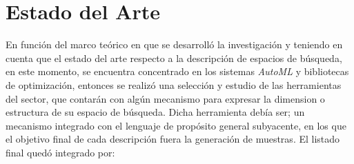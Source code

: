 \section{Estado del Arte}

En función del marco teórico en que se desarrolló la investigación y teniendo en cuenta
que el estado del arte respecto a la descripción de espacios de búsqueda, en este momento,
se encuentra concentrado en los sistemas {\it AutoML} y bibliotecas de optimización, entonces
se realizó una selección y estudio de las herramientas del sector, que contarán con algún
mecanismo para expresar la dimension o estructura de su espacio de búsqueda. Dicha
herramienta debía ser; un mecanismo integrado con el lenguaje de propósito general
subyacente, en los que el objetivo final de cada descripción fuera la generación de
muestras. El listado final quedó integrado por:

